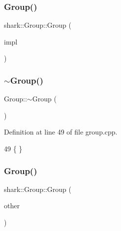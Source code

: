 \subsubsection{\texorpdfstring{Group()}{Group()}\hspace{0.1cm}{\footnotesize\ttfamily [1/2]}}
{\footnotesize\ttfamily shark\+::\+Group\+::\+Group (\begin{DoxyParamCaption}\item[{std\+::unique\+\_\+ptr$<$ Group\+Impl $>$ \&\&}]{impl }\end{DoxyParamCaption})\hspace{0.3cm}{\ttfamily [private]}}

\hypertarget{classshark_1_1_group_aed00a22ff227ee2657ae44a5cbcedf7c}{}\label{classshark_1_1_group_aed00a22ff227ee2657ae44a5cbcedf7c} 
\subsubsection{\texorpdfstring{$\sim$\+Group()}{~Group()}}
{\footnotesize\ttfamily Group\+::$\sim$\+Group (\begin{DoxyParamCaption}{ }\end{DoxyParamCaption})}



Definition at line 49 of file group.\+cpp.


\begin{DoxyCode}
49 \{ \}
\end{DoxyCode}
\hypertarget{classshark_1_1_group_aeee7d7330ef0f51e426e93978b3376b3}{}\label{classshark_1_1_group_aeee7d7330ef0f51e426e93978b3376b3} 
\subsubsection{\texorpdfstring{Group()}{Group()}\hspace{0.1cm}{\footnotesize\ttfamily [2/2]}}
{\footnotesize\ttfamily shark\+::\+Group\+::\+Group (\begin{DoxyParamCaption}\item[{const \hyperlink{classshark_1_1_group}{Group} \&}]{other }\end{DoxyParamCaption})\hspace{0.3cm}{\ttfamily [delete]}}



